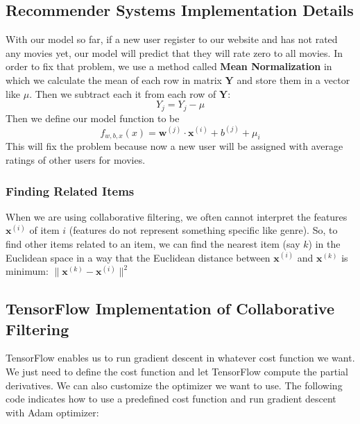 \documentclass[a4paper, 12pt]{book}
\begin{document}
\subsection{Recommender Systems Implementation Details}

With our model so far, if a new user register to our website and has not rated any movies yet, our model will predict that they will rate zero to all movies. In order to fix that problem, we use a method called \textbf{Mean Normalization} in which we calculate the mean of each row in matrix $\mathbf{Y}$ and store them in a vector like $\mu$. Then we subtract each it from each row of $\mathbf{Y}$: \[Y_j = Y_j - \mu\] Then we define our model function to be \[f_{w,b,x}(x) = \mathbf{w}^{(j)} \cdot \mathbf{x}^{(i)} + b^{(j)} + \mu_i\] This will fix the problem because now a new user will be assigned with average ratings of other users for movies.

\subsubsection{Finding Related Items}

When we are using collaborative filtering, we often cannot interpret the features $\mathbf{x}^{(i)}$ of item $i$ (features do not represent something specific like genre). So, to find other items related to an item, we can find the nearest item (say $k$) in the Euclidean space in a way that the Euclidean distance between $\mathbf{x}^{(i)}$ and $\mathbf{x}^{(k)}$ is minimum: $\| \mathbf{x}^{(k)} - \mathbf{x}^{(i)} \|^2$

\subsection{TensorFlow Implementation of Collaborative Filtering}

TensorFlow enables us to run gradient descent in whatever cost function we want. We just need to define the cost function and let TensorFlow compute the partial derivatives. We can also customize the optimizer we want to use. The following code indicates how to use a predefined cost function and run gradient descent with Adam optimizer:
\end{document}

